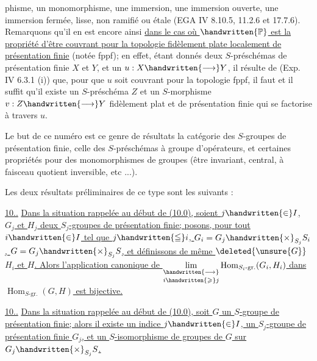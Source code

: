 %
%
phisme, un monomorphisme, une immersion, une immersion ouverte, une immersion fermée, lisse, non ramifié ou étale (EGA IV 8.10.5, 11.2.6 et 17.7.6). Remarquons qu'il en est encore ainsi  \uline{dans le cas où $\handwritten{\mathbb{P}}$ est la propriété d'être couvrant pour la topologie fidèlement plate localement de présentation finie} (notée fppf); en effet, étant donnés deux $S$-préschémas de présentation finie $X$ et $Y$, et un  $u:X\handwritten{\longrightarrow}Y$, il résulte de (Exp. IV 6.3.1 (i))\deleted{,} que, pour que $u$ soit couvrant pour la topologie fppf, il faut et il suffit qu'il existe un $S$-préschéma $Z$ et un $S$-morphisme $v:Z\handwritten{\longrightarrow}Y$ fidèlement plat et de présentation finie qui se factorise à travers $u$.

Le but de ce numéro est  ce genre de résultats  la catégorie des $S$-groupes de présentation finie,  celle des $S$-préschémas à groupe d'opérateurs, et  certaines propriétés pour des monomorphismes de groupes (être invariant, central, à faisceau quotient inversible, etc ...).

Les deux résultats préliminaires de ce type sont les suivants :

\uline{10..}  \uline{Dans la situation rappelée au début de (10.0), soient  $j\handwritten{\in}I$, $G_j$ et $H_j$ deux $S_j$-groupes de présentation finie; posons, pour tout $i\handwritten{\in}I$ tel que $j\handwritten{\leqq}i$, $G_i=G_j\handwritten{\times}_{S_j}S_i$, $G=G_j\handwritten{\times}_{S_j}S$, et définissons de même $\deleted{\unsure{G}}$ $H_i$ et $H$. Alors l'application canonique de $\underset{i\handwritten{\geqslant}j}{\underset{\handwritten{\longrightarrow}}{\lim}}\operatorname{Hom}_{S_i\text{-gr.}}(G_i,H_i)$ dans $\operatorname{Hom}_{S\text{-gr.}}(G,H)$ est bijective.}

\uline{10..}  \uline{Dans la situation rappelée au début de (10.0), soit $G$ un $S$-groupe de présentation finie; alors il existe un indice $j\handwritten{\in}I$,  un $S_j$-groupe de présentation  finie $G_j$, et un  $S$-isomorphisme de groupes de $G$ sur $G_j\handwritten{\times}_{S_j}S$.}

